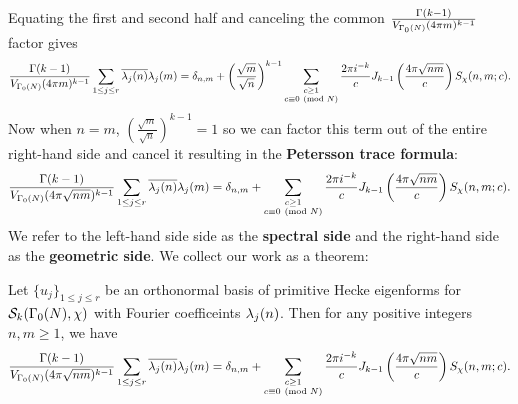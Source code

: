       Equating the first and second half and canceling the common $\frac{\Gamma(k-1)}{V_{\Gamma_{0}(N)}(4\pi m)^{k-1}}$ factor gives
      \[
        \frac{\Gamma(k-1)}{V_{\Gamma_{0}(N)}(4\pi m)^{k-1}}\sum_{1 \le j \le r}\overline{\lambda_{j}(n)}\lambda_{j}(m) = \delta_{n,m}+\left(\frac{\sqrt{m}}{\sqrt{n}}\right)^{k-1}\sum_{\substack{c \ge 1 \\ c \equiv 0 \ \left(\text{mod }N\right)}}\frac{2\pi i^{-k}}{c}J_{k-1}\left(\frac{4\pi\sqrt{nm}}{c}\right)S_{\chi}(n,m;c).
      \]
      Now when $n = m$, $\left(\frac{\sqrt{m}}{\sqrt{n}}\right)^{k-1} = 1$ so we can factor this term out of the entire right-hand side and cancel it resulting in the \textbf{Petersson trace formula}:
      \[
        \frac{\Gamma(k-1)}{V_{\Gamma_{0}(N)}(4\pi\sqrt{nm})^{k-1}}\sum_{1 \le j \le r}\overline{\lambda_{j}(n)}\lambda_{j}(m) = \delta_{n,m}+\sum_{\substack{c \ge 1 \\ c \equiv 0 \ \left(\text{mod }N\right)}}\frac{2\pi i^{-k}}{c}J_{k-1}\left(\frac{4\pi\sqrt{nm}}{c}\right)S_{\chi}(n,m;c).
      \]
      We refer to the left-hand side side as the \textbf{spectral side} and the right-hand side as the \textbf{geometric side}. We collect our work as a theorem:

      \begin{theorem}
        Let $\{u_{j}\}_{1 \le j \le r}$ be an orthonormal basis of primitive Hecke eigenforms for $\mathcal{S}_{k}(\Gamma_{0}(N),\chi)$ with Fourier coefficeints $\lambda_{j}(n)$. Then for any positive integers $n,m \ge 1$, we have
        \[
          \frac{\Gamma(k-1)}{V_{\Gamma_{0}(N)}(4\pi\sqrt{nm})^{k-1}}\sum_{1 \le j \le r}\overline{\lambda_{j}(n)}\lambda_{j}(m) = \delta_{n,m}+\sum_{\substack{c \ge 1 \\ c \equiv 0 \ \left(\text{mod }N\right)}}\frac{2\pi i^{-k}}{c}J_{k-1}\left(\frac{4\pi\sqrt{nm}}{c}\right)S_{\chi}(n,m;c).
        \]
      \end{theorem}

